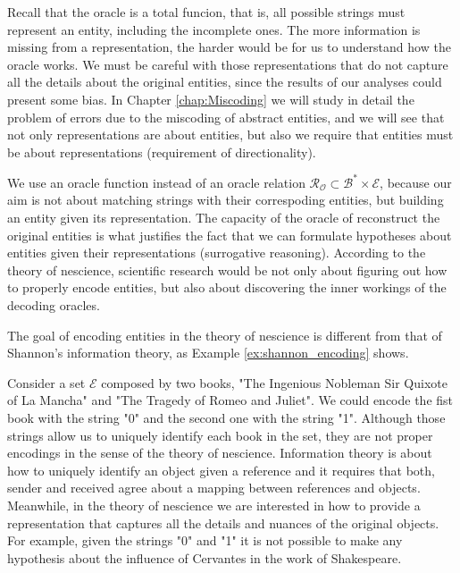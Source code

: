 Recall that the oracle is a total funcion, that is, all possible strings must represent an entity, including the incomplete ones. The more information is missing from a representation, the harder would be for us to understand how the oracle works. We must be careful with those representations that do not capture all the details about the original entities, since the results of our analyses could present some bias. In Chapter \ref{chap:Miscoding} we will study in detail the problem of errors due to the miscoding of abstract entities, and we will see that not only representations are about entities, but also we require that entities must be about representations (requirement of directionality).

We use an oracle function instead of an oracle relation $\mathcal{R}_\mathcal{O} \subset \mathcal{B}^\ast \times \mathcal{E}$, because our aim is not about matching strings with their correspoding entities, but building an entity given its representation. The capacity of the oracle of reconstruct the original entities is what justifies the fact that we can formulate hypotheses about entities given their representations (surrogative reasoning). According to the theory of nescience, scientific research would be not only about figuring out how to properly encode entities, but also about discovering the inner workings of the decoding oracles. 

The goal of encoding entities in the theory of nescience is different from that of Shannon's information theory, as Example \ref{ex:shannon_encoding} shows.

\begin{example}
\label{ex:shannon_encoding}
Consider a set $\mathcal{E}$ composed by two books, "The Ingenious Nobleman Sir Quixote of La Mancha" and "The Tragedy of Romeo and Juliet". We could encode the fist book with the string "0" and the second one with the string "1". Although those strings allow us to uniquely identify each book in the set, they are not proper encodings in the sense of the theory of nescience. Information theory is about how to uniquely identify an object given a reference and it requires that both, sender and received agree about a mapping between references and objects. Meanwhile, in the theory of nescience we are interested in how to provide a representation that captures all the details and nuances of the original objects. For example, given the strings "0" and "1" it is not possible to make any hypothesis about the influence of Cervantes in the work of Shakespeare.
\end{example}

